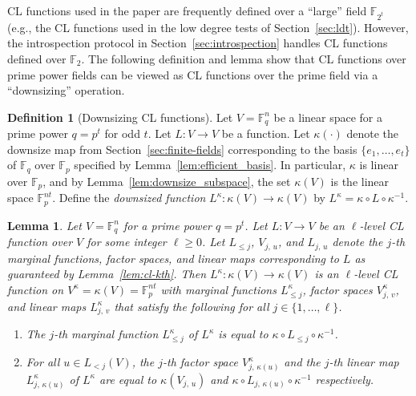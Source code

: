 \documentclass[11pt]{article}
\newtheorem{lemma}[theorem]{Lemma}
\theoremstyle{definition}
\newtheorem{definition}[theorem]{Definition}
\newcommand{\F}{\ensuremath{\mathbb{F}}}
\newcommand{\downsize}{\kappa}
\begin{document}
CL functions used in the paper are frequently defined over a ``large'' field
$\F_{2^t}$ (e.g., the CL functions used in the low degree tests of
Section~\ref{sec:ldt}).
However, the introspection protocol in Section~\ref{sec:introspection} handles
CL functions defined over $\F_2$.
The following definition and lemma show that CL functions over prime power
fields can be viewed as CL functions over the prime field via a ``downsizing''
operation.

\begin{definition}[Downsizing CL functions]
  \label{def:cl-downsize}
  Let $V = \F_{q}^n$ be a linear space for a prime power $q=p^t$ for odd $t$.
  Let $L: V \to V$ be a function.
  Let $\downsize(\cdot)$ denote the downsize map from
  Section~\ref{sec:finite-fields} corresponding to the basis
  $\{e_1,\ldots,e_t\}$ of $\F_q$ over $\F_p$ specified by
  Lemma~\ref{lem:efficient_basis}.
  In particular, $\downsize$ is linear over $\F_p$, and by
  Lemma~\ref{lem:downsize_subspace}, the set $\downsize(V)$ is the linear space
  $\F_p^{nt}$.
  Define the \emph{downsized function} $L^\downsize : \downsize(V) \to
  \downsize(V)$ by $L^\downsize = \downsize \circ L \circ \downsize^{-1}$.
\end{definition}

\begin{lemma}
  \label{lem:cl-downsize}
	Let $V = \F_q^n$ for a prime power $q = p^t$.
  Let $L: V \to V$ be an $\ell$-level CL function over $V$ for some integer
  $\ell \ge 0$.
  Let $L_{\leq j}$, $V_{j,\, u}$, and $L_{j,\, u}$ denote the $j$-th marginal
  functions, factor spaces, and linear maps corresponding to $L$ as guaranteed
  by Lemma~\ref{lem:cl-kth}.
  Then $L^\downsize: \downsize(V) \to \downsize(V)$ is an $\ell$-level CL
  function on $V^\downsize = \downsize(V) = \F_p^{nt}$ with marginal functions
  $L^\downsize_{\leq j}$, factor spaces $V^\downsize_{j,\, v}$, and linear maps
  $L^\downsize_{j,\, v}$ that satisfy the following for all
  $j\in\{1,\ldots,\ell\}$.
  \begin{enumerate}
  \item The $j$-th marginal function $L^\downsize_{\leq j}$ of $L^\downsize$ is
    equal to $\downsize \circ L_{\leq j} \circ \downsize^{-1}$.
	\item For all $u \in L_{< j} (V)$, the $j$-th factor space $V_{j,\,
      \downsize(u)}^\downsize$ and the $j$-th linear map $L_{j,\,
      \downsize(u)}^\downsize$ of $L^\downsize$ are equal to $\downsize(V_{j,\,
      u})$ and $\downsize \circ L_{j,\, \downsize(u)} \circ \downsize^{-1}$ respectively.
  \end{enumerate}
\end{lemma}
\end{document}
